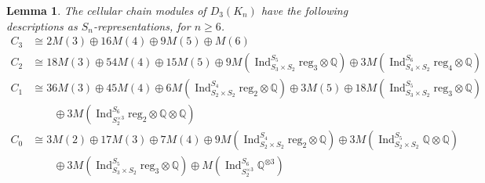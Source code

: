 \documentclass[12pt]{amsart}
\newtheorem{lem}[thm]{Lemma}
\theoremstyle{definition}
\newcommand{\Q}{\mathbb{Q}}
\newcommand{\ind}{\operatorname{Ind}}
\newcommand{\triv}{\mathrm{triv}}
\newcommand{\reg}{\mathrm{reg}}
\begin{document}
\begin{lem}
The cellular chain modules of $D_3(K_n)$ have the following descriptions as $S_n$-representations, for $n\geq 6$.
\begin{align*}
C_3 &\cong 2M(3) \oplus 16M(4)\oplus 9M(5)\oplus M(6)\\
C_2 &\cong 18M(3) \oplus 54M(4) \oplus 15M(5) \oplus 9M(\ind_{S_3\times S_2}^{S_5} \reg_3\otimes \Q)\oplus 3M(\ind_{S_4\times S_2}^{S_6}\reg_4\otimes \Q)\\
C_1 &\cong 36M(3)\oplus 45M(4)\oplus 6M(\ind_{S_2\times S_2}^{S_4}\reg_2\otimes \Q)\oplus 3M(5)\oplus 18M(\ind_{S_3\times S_2}^{S_5}\reg_3\otimes \Q)\\
&\qquad \oplus 3M(\ind_{S_2^{\times 3}}^{S_6} \reg_2 \otimes \Q \otimes \Q)\\
C_0 &\cong 3M(2) \oplus 17M(3) \oplus 7M(4) \oplus 9M(\ind_{S_2\times S_2}^{S_4}\reg_2\otimes \Q) \oplus 3M(\ind_{S_2\times S_2}^{S_5} \Q\otimes \Q) \\
&\qquad \oplus 3M(\ind_{S_3\times S_2}^{S_5}\reg_3\otimes \Q) \oplus M(\ind_{S_2^{\times 3}}^{S_6} \Q^{\otimes 3})
\end{align*}

\end{lem}
\end{document}
